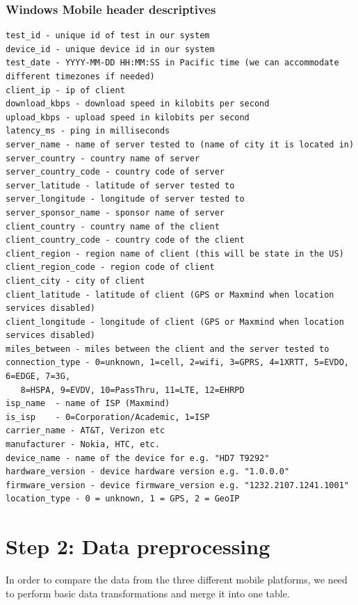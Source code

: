 \documentclass[]{article}
\begin{document}
\normalsize

\subsubsection{Windows Mobile header
descriptives}\label{windows-mobile-header-descriptives}

\footnotesize

\begin{verbatim}
test_id - unique id of test in our system
device_id - unique device id in our system
test_date - YYYY-MM-DD HH:MM:SS in Pacific time (we can accommodate different timezones if needed)
client_ip - ip of client 
download_kbps - download speed in kilobits per second
upload_kbps - upload speed in kilobits per second
latency_ms - ping in milliseconds
server_name - name of server tested to (name of city it is located in)
server_country - country name of server
server_country_code - country code of server
server_latitude - latitude of server tested to
server_longitude - longitude of server tested to
server_sponsor_name - sponsor name of server
client_country - country name of the client
client_country_code - country code of the client
client_region - region name of client (this will be state in the US)
client_region_code - region code of client
client_city - city of client
client_latitude - latitude of client (GPS or Maxmind when location services disabled)
client_longitude - longitude of client (GPS or Maxmind when location services disabled)
miles_between - miles between the client and the server tested to
connection_type - 0=unknown, 1=cell, 2=wifi, 3=GPRS, 4=1XRTT, 5=EVDO, 6=EDGE, 7=3G, 
   8=HSPA, 9=EVDV, 10=PassThru, 11=LTE, 12=EHRPD
isp_name  - name of ISP (Maxmind) 
is_isp    - 0=Corporation/Academic, 1=ISP
carrier_name - AT&T, Verizon etc 
manufacturer - Nokia, HTC, etc.
device_name - name of the device for e.g. "HD7 T9292" 
hardware_version - device hardware version e.g. "1.0.0.0"
firmware_version - device firmware_version e.g. "1232.2107.1241.1001"
location_type - 0 = unknown, 1 = GPS, 2 = GeoIP
\end{verbatim}

\normalsize

\section{Step 2: Data preprocessing}\label{step-2-data-preprocessing}

In order to compare the data from the three different mobile platforms,
we need to perform basic data transformations and merge it into one
table.
\end{document}
